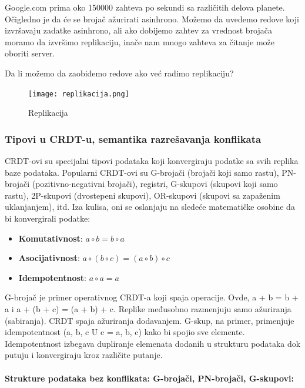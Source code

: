 \documentclass[12pt]{article}
\begin{document}
    Google.com prima oko 150000 zahteva po sekundi sa različitih delova planete. Očigledno je da će se brojač ažurirati asinhrono. Možemo da uvedemo redove koji izvršavaju zadatke asinhrono, ali ako dobijemo zahtev za vrednost brojača moramo da izvršimo replikaciju, inače nam mnogo zahteva za čitanje može oboriti server.

    Da li možemo da zaobiđemo redove ako već radimo replikaciju?

    \begin{figure}[H]
        \centering
        \texttt{[image: replikacija.png]}
        \caption{Replikacija}
        \label{fig:nls_demo}
    \end{figure}
    
    \subsubsection{Tipovi u CRDT-u, semantika razrešavanja konflikata}

    CRDT-ovi su specijalni tipovi podataka koji konvergiraju podatke sa svih replika baze podataka. Popularni CRDT-ovi su G-brojači (brojači koji samo rastu), PN-brojači (pozitivno-negativni brojači), registri, G-skupovi (skupovi koji samo rastu), 2P-skupovi (dvostepeni skupovi), OR-skupovi (skupovi sa zapaženim uklanjanjem), itd. Iza kulisa, oni se oslanjaju na sledeće matematičke osobine da bi konvergirali podatke:

    \begin{itemize}
        \item \textbf{Komutativnost}: $a \circ b = b \circ a $
        \item \textbf{Asocijativnost}: $a \circ (b \circ c) = (a \circ b) \circ c $
        \item \textbf{Idempotentnost}: $a \circ a = a $
    \end{itemize}
    
    G-brojač je primer operativnog CRDT-a koji spaja operacije. Ovde, a + b = b + a i a + (b + c) = (a + b) + c. Replike međusobno razmenjuju samo ažuriranja (sabiranja). CRDT spaja ažuriranja dodavanjem. G-skup, na primer, primenjuje idempotentnost ({a, b, c} U {c} = {a, b, c}) kako bi spojio sve elemente. Idempotentnost izbegava dupliranje elemenata dodanih u strukturu podataka dok putuju i konvergiraju kroz različite putanje.

    \paragraph{Strukture podataka bez konflikata: G-brojači, PN-brojači, G-skupovi:}
\end{document}
